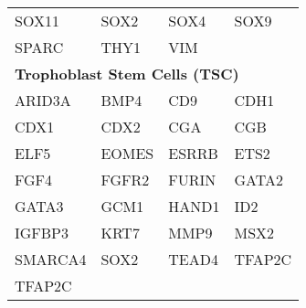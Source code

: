 \documentclass[a4paper,12pt]{article}
\begin{document}
\begin{table}[!htb]
\begin{tabular}{llll}
SOX11\cite{Kubo2009} & SOX2\cite{Park2012, Han2014, Matic2016} & SOX4\cite{Tiwari2013} & SOX9\cite{Frobel2014, Almalki2016} \\
SPARC\cite{Frobel2014, Bradshaw2001} & THY1\cite{Lin2013, Obara2016} & VIM\cite{Ivaska2007} & \\ \hline
\multicolumn{4}{l}{{\bf Trophoblast Stem Cells (TSC)}} \\ \hline
ARID3A\cite{Rhee2017} & BMP4\cite{Kubaczka2014} & CD9\cite{Douglas2009} & CDH1\cite{Ohinata2014} \\
CDX1\cite{Peiffer2007} & CDX2\cite{Strumpf2005, Peiffer2007, Chen2013, Kubaczka2014} & CGA\cite{Li2013, Schulz2008, Peiffer2007} & CGB\cite{Li2013, Schulz2008, Douglas2009} \\
ELF5\cite{Lee2016, Ohinata2014} & EOMES\cite{Ohinata2014, Li2013, Kidder2010, Kubaczka2014} & ESRRB\cite{Ohinata2014} & ETS2\cite{Kubaczka2014} \\
FGF4\cite{Tanaka1998} & FGFR2\cite{Haffner-Krausz1999, Ohinata2014, Kubaczka2014} & FURIN\cite{Kubaczka2014} & GATA2\cite{Schulz2008, Peiffer2007} \\
GATA3\cite{Kubaczka2014} & GCM1\cite{Schulz2008} & HAND1\cite{Peiffer2007} & ID2\cite{Selesniemi2005, Selesniemi2016} \\
IGFBP3\cite{Schulz2008} & KRT7\cite{Schulz2008, Douglas2009} & MMP9\cite{Schulz2008} & MSX2\cite{Schulz2008, Liang2016} \\
SMARCA4\cite{Kidder2010} & SOX2\cite{Ohinata2014, Schulz2008} & TEAD4\cite{Yagi2007} & TFAP2C\cite{Kubaczka2014} \\
TFAP2C\cite{Ohinata2014, Kidder2010, Kubaczka2014} &  &  & \\
\bottomrule
\end{tabular}
\end{table}
\end{document}
